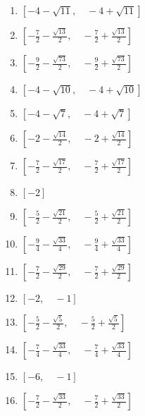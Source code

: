 \documentclass[9pt,dvipdfmx,a4paper]{article}
\begin{document}
\begin{multicols}{2}
\begin{enumerate}
\item
$ \left [ -4 - \sqrt{11}, \quad -4 + \sqrt{11}\right ]$

\item
$ \left [ - \frac{7}{2} - \frac{\sqrt{13}}{2}, \quad - \frac{7}{2} + \frac{\sqrt{13}}{2}\right ]$

\item
$ \left [ - \frac{9}{2} - \frac{\sqrt{73}}{2}, \quad - \frac{9}{2} + \frac{\sqrt{73}}{2}\right ]$

\item
$ \left [ -4 - \sqrt{10}, \quad -4 + \sqrt{10}\right ]$

\item
$ \left [ -4 - \sqrt{7}, \quad -4 + \sqrt{7}\right ]$

\item
$ \left [ -2 - \frac{\sqrt{14}}{2}, \quad -2 + \frac{\sqrt{14}}{2}\right ]$

\item
$ \left [ - \frac{7}{2} - \frac{\sqrt{17}}{2}, \quad - \frac{7}{2} + \frac{\sqrt{17}}{2}\right ]$

\item
$ \left [ -2\right ]$

\item
$ \left [ - \frac{5}{2} - \frac{\sqrt{21}}{2}, \quad - \frac{5}{2} + \frac{\sqrt{21}}{2}\right ]$

\item
$ \left [ - \frac{9}{4} - \frac{\sqrt{33}}{4}, \quad - \frac{9}{4} + \frac{\sqrt{33}}{4}\right ]$

\item
$ \left [ - \frac{7}{2} - \frac{\sqrt{29}}{2}, \quad - \frac{7}{2} + \frac{\sqrt{29}}{2}\right ]$

\item
$ \left [ -2, \quad -1\right ]$

\item
$ \left [ - \frac{5}{2} - \frac{\sqrt{5}}{2}, \quad - \frac{5}{2} + \frac{\sqrt{5}}{2}\right ]$

\item
$ \left [ - \frac{7}{4} - \frac{\sqrt{33}}{4}, \quad - \frac{7}{4} + \frac{\sqrt{33}}{4}\right ]$

\item
$ \left [ -6, \quad -1\right ]$

\item
$ \left [ - \frac{7}{2} - \frac{\sqrt{33}}{2}, \quad - \frac{7}{2} + \frac{\sqrt{33}}{2}\right ]$


\end{enumerate}
\end{multicols}
\end{document}
